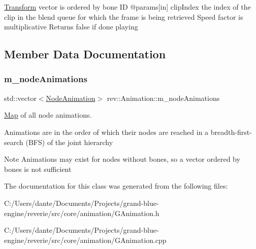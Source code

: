 \mbox{\hyperlink{classrev_1_1_transform}{Transform}} vector is ordered by bone ID @params\mbox{[}in\mbox{]} clip\+Index the index of the clip in the blend queue for which the frame is being retrieved Speed factor is multiplicative Returns false if done playing 

\subsection{Member Data Documentation}
\mbox{\label{classrev_1_1_animation_adb990389fc3a35fadae1a59246aa329e}} 
\subsubsection{\texorpdfstring{m\_nodeAnimations}{m\_nodeAnimations}}
{\footnotesize\ttfamily std\+::vector$<$\mbox{\hyperlink{classrev_1_1_node_animation}{Node\+Animation}}$>$ rev\+::\+Animation\+::m\+\_\+node\+Animations}



\mbox{\hyperlink{classrev_1_1_map}{Map}} of all node animations. 

Animations are in the order of which their nodes are reached in a breadth-\/first-\/search (B\+FS) of the joint hierarchy \begin{DoxyNote}{Note}
Animations may exist for nodes without bones, so a vector ordered by bones is not sufficient 
\end{DoxyNote}


The documentation for this class was generated from the following files\+:\begin{DoxyCompactItemize}
\item 
C\+:/\+Users/dante/\+Documents/\+Projects/grand-\/blue-\/engine/reverie/src/core/animation/G\+Animation.\+h\item 
C\+:/\+Users/dante/\+Documents/\+Projects/grand-\/blue-\/engine/reverie/src/core/animation/G\+Animation.\+cpp\end{DoxyCompactItemize}
